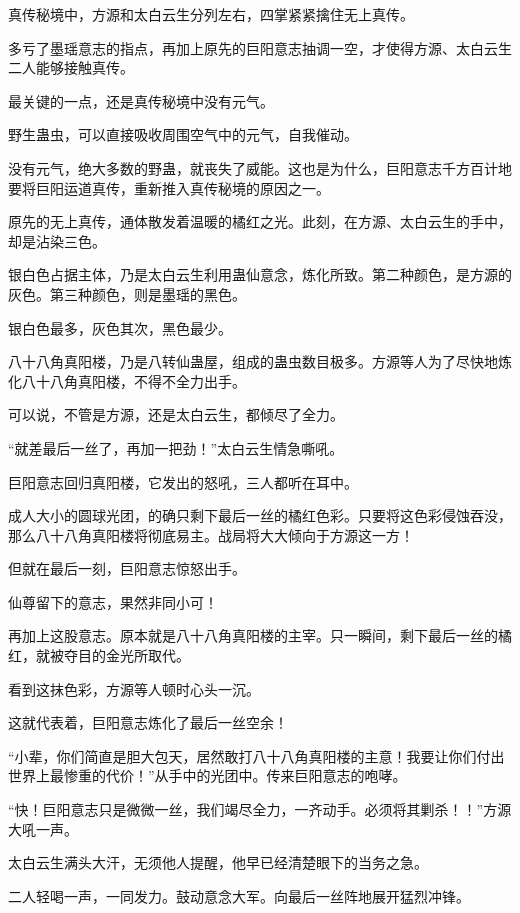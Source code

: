 
\begin{this_body}

真传秘境中，方源和太白云生分列左右，四掌紧紧擒住无上真传。

多亏了墨瑶意志的指点，再加上原先的巨阳意志抽调一空，才使得方源、太白云生二人能够接触真传。

最关键的一点，还是真传秘境中没有元气。

野生蛊虫，可以直接吸收周围空气中的元气，自我催动。

没有元气，绝大多数的野蛊，就丧失了威能。这也是为什么，巨阳意志千方百计地要将巨阳运道真传，重新推入真传秘境的原因之一。

原先的无上真传，通体散发着温暖的橘红之光。此刻，在方源、太白云生的手中，却是沾染三色。

银白色占据主体，乃是太白云生利用蛊仙意念，炼化所致。第二种颜色，是方源的灰色。第三种颜色，则是墨瑶的黑色。

银白色最多，灰色其次，黑色最少。

八十八角真阳楼，乃是八转仙蛊屋，组成的蛊虫数目极多。方源等人为了尽快地炼化八十八角真阳楼，不得不全力出手。

可以说，不管是方源，还是太白云生，都倾尽了全力。

“就差最后一丝了，再加一把劲！”太白云生情急嘶吼。

巨阳意志回归真阳楼，它发出的怒吼，三人都听在耳中。

成人大小的圆球光团，的确只剩下最后一丝的橘红色彩。只要将这色彩侵蚀吞没，那么八十八角真阳楼将彻底易主。战局将大大倾向于方源这一方！

但就在最后一刻，巨阳意志惊怒出手。

仙尊留下的意志，果然非同小可！

再加上这股意志。原本就是八十八角真阳楼的主宰。只一瞬间，剩下最后一丝的橘红，就被夺目的金光所取代。

看到这抹色彩，方源等人顿时心头一沉。

这就代表着，巨阳意志炼化了最后一丝空余！

“小辈，你们简直是胆大包天，居然敢打八十八角真阳楼的主意！我要让你们付出世界上最惨重的代价！”从手中的光团中。传来巨阳意志的咆哮。

“快！巨阳意志只是微微一丝，我们竭尽全力，一齐动手。必须将其剿杀！！”方源大吼一声。

太白云生满头大汗，无须他人提醒，他早已经清楚眼下的当务之急。

二人轻喝一声，一同发力。鼓动意念大军。向最后一丝阵地展开猛烈冲锋。


\end{this_body}
